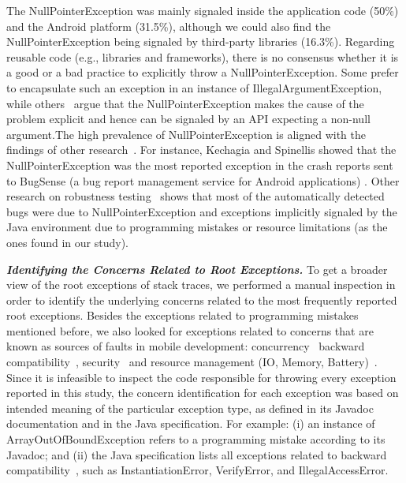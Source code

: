  The NullPointerException was mainly signaled inside the application code (50\%) and the Android platform (31.5\%),
 although we could also find the NullPointerException being signaled by third-party libraries (16.3\%). 
Regarding reusable code (e.g., libraries and frameworks), there is no consensus whether it is a good or a bad practice to 
explicitly throw a NullPointerException. Some prefer to encapsulate such an exception in
an instance of IllegalArgumentException, while others~\cite{bloch2008effective} argue that the
NullPointerException makes the cause of the problem explicit and hence 
can be signaled by an API expecting a non-null argument.The high prevalence of NullPointerException is aligned with the
findings of other 
research~\cite{kim2013predicting,fraser20131600,csallner2004jcrasher,kechagia2014}. 
For instance, Kechagia and Spinellis showed that the NullPointerException was the  
most reported exception in the crash reports sent to BugSense (a bug report 
management service for Android applications)  \cite{kechagia2014}.
Other research on robustness testing~\cite{maji2012empirical,csallner2004jcrasher} shows that most of the automatically 
detected bugs were due to NullPointerException and exceptions
implicitly signaled by the Java 
environment due to programming mistakes or resource limitations
 (as the ones found in our study).


\emph{\textbf{Identifying the Concerns Related to Root Exceptions.}} To get a broader view of the root exceptions of stack traces,
we performed a manual inspection in order to identify the underlying
concerns related to the most frequently reported root exceptions.
Besides the exceptions related to programming mistakes mentioned before, we also looked for exceptions related to concerns that are known as sources of faults in mobile development: concurrency~\cite{ama2012} backward compatibility~\cite{McDon13}, security~\cite{enck2011study,was2010} and resource management (IO, Memory, Battery)~\cite{Zhang12}. Since it is infeasible to inspect the code responsible for throwing every exception reported in this study,
the concern identification for each exception was based on intended
meaning of the particular exception type, as defined in 
its Javadoc documentation and in the Java specification. 
For example: (i) an instance of ArrayOutOfBoundException  
refers to a programming mistake according to its Javadoc; and (ii) the Java specification lists all 
exceptions related to backward compatibility~\cite{javaback}, such as
InstantiationError, VerifyError, and IllegalAccessError.


